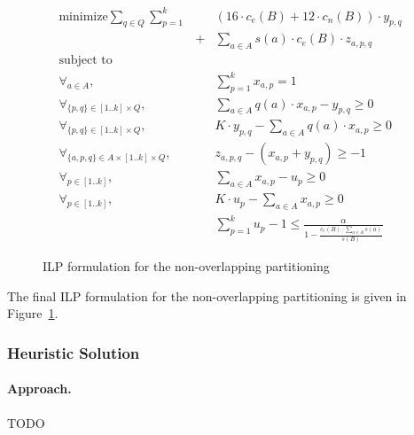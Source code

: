\begin{figure}[!t]
\begin{mdframed}
\begin{eqnarray}
\text{minimize}  
    \sum_{q\in Q} \sum_{p=1}^{k} && (16\cdot c_e(B) + 12\cdot c_n(B))\cdot y_{p,q}\nonumber\\
    &+& \sum_{a\in A} s(a)\cdot c_e(B)\cdot z_{a,p,q} \nonumber\\
\text{subject to}&&\nonumber\\
\forall_{a\in A}, 
    && \sum_{p=1}^{k} x_{a,p} = 1\nonumber\\
\forall_{\{p,q\}\in [1..k]\times Q}, 
    &&  \sum_{a\in A} q(a)\cdot x_{a,p} - y_{p,q} \geq 0 \nonumber\\
\forall_{\{p,q\}\in [1..k]\times Q}, 
    &&  K\cdot y_{p,q} - \sum_{a\in A} q(a)\cdot x_{a,p}  \geq 0 \nonumber\\
\forall_{\{a,p,q\}\in A\times [1..k]\times Q},
    && z_{a,p,q} - (x_{a,p} + y_{p,q}) \geq -1\nonumber\\
\forall_{p\in[1..k]},
    && \sum_{a\in A} x_{a,p} - u_p \geq 0 \nonumber\\
\forall_{p\in[1..k]},
    && K\cdot u_p - \sum_{a\in A} x_{a,p} \geq 0 \nonumber\\    
&& \sum_{p=1}^{k} u_p -1 \leq \frac{\alpha}
  {1-\frac{c_e(B)\cdot \sum_{a\in A} s(a)}{s(B)}} \nonumber
\end{eqnarray}
\end{mdframed}
\caption{ILP formulation for the non-overlapping partitioning}
\label{fig:no-ilp}
\end{figure}

The final ILP formulation for the non-overlapping partitioning is given in
Figure~\ref{fig:no-ilp}.

\subsubsection{Heuristic Solution}

\paragraph*{Approach.$\,$}
TODO

